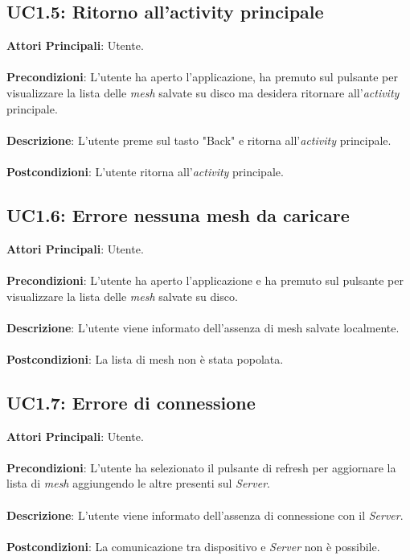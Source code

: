 \subsection{UC1.5: Ritorno all'activity principale}
\textbf{Attori Principali}: Utente.
\\\\ \textbf{Precondizioni}: L'utente ha aperto l'applicazione, ha premuto sul pulsante per visualizzare la lista delle \emph{mesh} salvate su disco ma desidera ritornare all'\emph{activity} principale.
\\\\ \textbf{Descrizione}: L'utente preme sul tasto "Back" e ritorna all'\emph{activity} principale.
\\\\ \textbf{Postcondizioni}: L'utente ritorna all'\emph{activity} principale.

\subsection{UC1.6: Errore nessuna mesh da caricare}
\textbf{Attori Principali}: Utente.
\\\\ \textbf{Precondizioni}: L'utente ha aperto l'applicazione e ha premuto sul pulsante per visualizzare la lista delle \emph{mesh} salvate su disco.
\\\\ \textbf{Descrizione}: L'utente viene informato dell'assenza di mesh salvate localmente.
\\\\ \textbf{Postcondizioni}: La lista di mesh non è stata popolata.

\subsection{UC1.7: Errore di connessione}
\textbf{Attori Principali}: Utente.
\\\\ \textbf{Precondizioni}: L'utente ha selezionato il pulsante di refresh per aggiornare la lista di \emph{mesh} aggiungendo le altre presenti sul \emph{Server}.
\\\\ \textbf{Descrizione}: L'utente viene informato dell'assenza di connessione con il \emph{Server}.
\\\\ \textbf{Postcondizioni}: La comunicazione tra dispositivo e \emph{Server} non è possibile.



